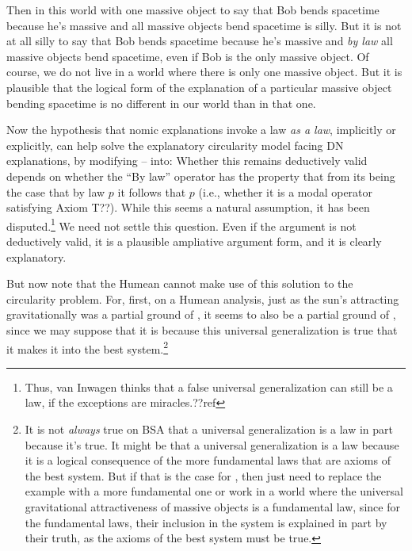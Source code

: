 Then in this world with one massive object to say that Bob bends spacetime because he's massive and all massive objects bend spacetime 
is  silly. But it is not at all silly to say that Bob bends spacetime because he's massive and \textit{by law} all massive objects bend
spacetime,  even if Bob is the only massive object. Of course, we do not live in a world where there is only one massive object.
But it is plausible that the logical form of the explanation of a particular massive object bending spacetime is no different in 
our world than in that one.

Now the hypothesis that nomic explanations invoke a law \textit{as a law}, implicitly or explicitly, can help solve the explanatory 
circularity model facing DN explanations, by modifying -- into:
Whether this remains deductively valid depends on whether the ``By law'' operator has the property that from its being the case that
by law $p$ it follows that $p$ (i.e., whether it is a modal operator satisfying Axiom T??). While this seems a natural assumption, it 
has been disputed.\footnote{Thus, van Inwagen thinks that a false universal generalization can still be a law, if the exceptions are 
miracles.??ref} We need not settle this question. Even if the argument is not deductively valid, it is a plausible ampliative argument
form, and it is clearly explanatory.

But now note that the Humean cannot make use of this solution to the circularity problem. For, first, on a Humean analysis, just as 
the sun's attracting gravitationally was a partial ground of , it seems to also be a partial ground of , 
since we may suppose that it is because this universal generalization is true that it makes it into the best 
system.\footnote{It is not \textit{always} true on BSA that a universal generalization is a law in part because it's true. 
It might be that a universal generalization is a law because it is a logical consequence of the more fundamental laws that are axioms of the 
best system. But if that is the case for , then just need to replace the example with a more fundamental one or work 
in a world where the universal gravitational attractiveness of massive objects is a fundamental law, since for the 
fundamental laws, their inclusion in the system is explained in part by their truth, as the axioms of the best system must
be true.} 

